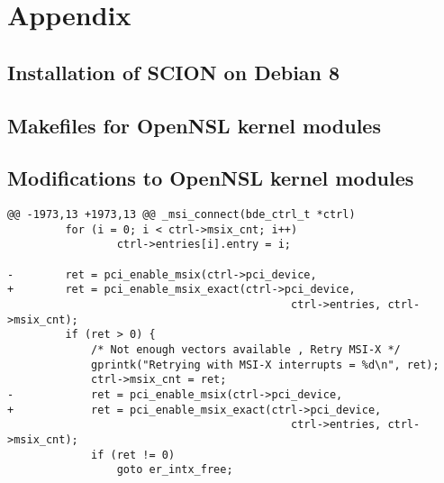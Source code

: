 \documentclass[a4paper]{article}
\begin{document}

\appendix
\section{Appendix}
\lstset{breaklines=true, basicstyle=\footnotesize}

\subsection{Installation of SCION on Debian 8}


\subsection{Makefiles for OpenNSL kernel modules} \label{app:kernel_module_makefiles}





\subsection{Modifications to OpenNSL kernel modules} \label{app:kernel_modules}
\begin{lstlisting}[caption={systems/bde/linux/kernel/linux-kernel-bde.c}]
@@ -1973,13 +1973,13 @@ _msi_connect(bde_ctrl_t *ctrl)
         for (i = 0; i < ctrl->msix_cnt; i++)
                 ctrl->entries[i].entry = i;

-        ret = pci_enable_msix(ctrl->pci_device,
+        ret = pci_enable_msix_exact(ctrl->pci_device,
                                            ctrl->entries, ctrl->msix_cnt);
         if (ret > 0) {
             /* Not enough vectors available , Retry MSI-X */
             gprintk("Retrying with MSI-X interrupts = %d\n", ret);
             ctrl->msix_cnt = ret;
-            ret = pci_enable_msix(ctrl->pci_device,
+            ret = pci_enable_msix_exact(ctrl->pci_device,
                                            ctrl->entries, ctrl->msix_cnt);
             if (ret != 0)
                 goto er_intx_free;
\end{lstlisting}
\end{document}
